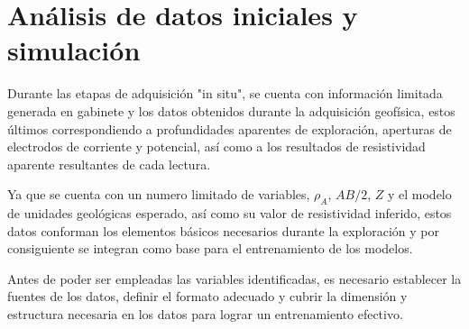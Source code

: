 	
	
	\section{Análisis de datos iniciales y simulación}
	
	Durante las etapas de adquisición "in situ", se cuenta con información limitada generada en gabinete y los datos obtenidos durante la adquisición geofísica, estos últimos correspondiendo a profundidades aparentes de exploración, aperturas de electrodos de corriente y potencial, así como a los resultados de resistividad aparente resultantes de cada lectura.
	
	Ya que se cuenta con un numero limitado de variables, $\rho _{A}$, $AB/2$, $Z$ y el modelo de unidades geológicas esperado, así como su valor de resistividad inferido, estos datos conforman los elementos básicos necesarios durante la exploración y por consiguiente se integran como base para el entrenamiento de los modelos.
	
	Antes de poder ser empleadas las variables identificadas, es necesario establecer la fuentes de los datos, definir el formato adecuado y cubrir la dimensión y estructura necesaria en los datos para lograr un entrenamiento efectivo. 
	
